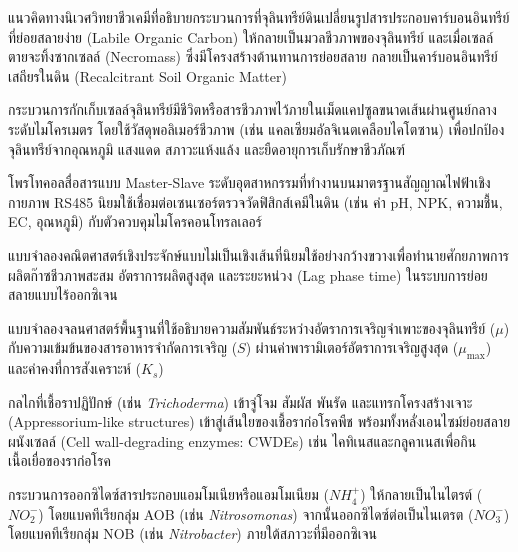 \begin{description}[leftmargin=1.8cm, style=nextline, font=\bfseries\color{agriGreen}]
\item[Microbial Carbon Pump (MCP)]
แนวคิดทางนิเวศวิทยาชีวเคมีที่อธิบายกระบวนการที่จุลินทรีย์ดินเปลี่ยนรูปสารประกอบคาร์บอนอินทรีย์ที่ย่อยสลายง่าย (Labile Organic Carbon) ให้กลายเป็นมวลชีวภาพของจุลินทรีย์ และเมื่อเซลล์ตายจะทิ้งซากเซลล์ (Necromass) ซึ่งมีโครงสร้างต้านทานการย่อยสลาย กลายเป็นคาร์บอนอินทรีย์เสถียรในดิน (Recalcitrant Soil Organic Matter)

\item[Microencapsulation (การห่อหุ้มระดับไมโคร)]
กระบวนการกักเก็บเซลล์จุลินทรีย์มีชีวิตหรือสารชีวภาพไว้ภายในเม็ดแคปซูลขนาดเส้นผ่านศูนย์กลางระดับไมโครเมตร โดยใช้วัสดุพอลิเมอร์ชีวภาพ (เช่น แคลเซียมอัลจิเนตเคลือบไคโตซาน) เพื่อปกป้องจุลินทรีย์จากอุณหภูมิ แสงแดด สภาวะแห้งแล้ง และยืดอายุการเก็บรักษาชีวภัณฑ์

\item[Modbus RTU Protocol]
โพรโทคอลสื่อสารแบบ Master-Slave ระดับอุตสาหกรรมที่ทำงานบนมาตรฐานสัญญาณไฟฟ้าเชิงกายภาพ RS485 นิยมใช้เชื่อมต่อเซนเซอร์ตรวจวัดฟิสิกส์เคมีในดิน (เช่น ค่า pH, NPK, ความชื้น, EC, อุณหภูมิ) กับตัวควบคุมไมโครคอนโทรลเลอร์

\item[Modified Gompertz Model]
แบบจำลองคณิตศาสตร์เชิงประจักษ์แบบไม่เป็นเชิงเส้นที่นิยมใช้อย่างกว้างขวางเพื่อทำนายศักยภาพการผลิตก๊าซชีวภาพสะสม อัตราการผลิตสูงสุด และระยะหน่วง (Lag phase time) ในระบบการย่อยสลายแบบไร้ออกซิเจน

\item[Monod Kinetic Model]
แบบจำลองจลนศาสตร์พื้นฐานที่ใช้อธิบายความสัมพันธ์ระหว่างอัตราการเจริญจำเพาะของจุลินทรีย์ ($\mu$) กับความเข้มข้นของสารอาหารจำกัดการเจริญ ($S$) ผ่านค่าพารามิเตอร์อัตราการเจริญสูงสุด ($\mu_{\max}$) และค่าคงที่การสังเคราะห์ ($K_s$)

\item[Mycoparasitism (ภาวะปรสิตของรา)]
กลไกที่เชื้อราปฏิปักษ์ (เช่น \textit{Trichoderma}) เข้าจู่โจม สัมผัส พันรัด และแทรกโครงสร้างเจาะ (Appressorium-like structures) เข้าสู่เส้นใยของเชื้อราก่อโรคพืช พร้อมทั้งหลั่งเอนไซม์ย่อยสลายผนังเซลล์ (Cell wall-degrading enzymes: CWDEs) เช่น ไคทิเนสและกลูคาเนสเพื่อกินเนื้อเยื่อของราก่อโรค

\item[Nitrification (ไนตริฟิเคชัน)]
กระบวนการออกซิไดซ์สารประกอบแอมโมเนียหรือแอมโมเนียม ($NH_4^+$) ให้กลายเป็นไนไตรต์ ($NO_2^-$) โดยแบคทีเรียกลุ่ม AOB (เช่น \textit{Nitrosomonas}) จากนั้นออกซิไดซ์ต่อเป็นไนเตรต ($NO_3^-$) โดยแบคทีเรียกลุ่ม NOB (เช่น \textit{Nitrobacter}) ภายใต้สภาวะที่มีออกซิเจน


\end{description}
